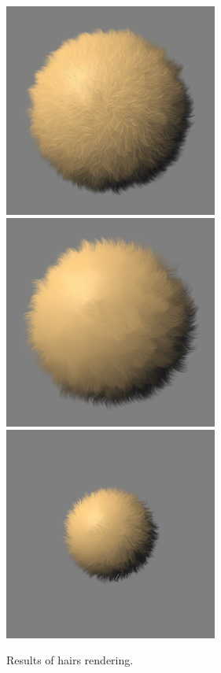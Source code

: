 \begin{figure}
    \begin{center}
    \includegraphics[width=70mm, height=70mm]{Resultats/bouledepoil1/final.png}
    \includegraphics[width=70mm, height=70mm]{Resultats/bouledepoil2/final.png}
    \includegraphics[width=70mm, height=70mm]{Resultats/bouledepoilFractalized/final.png}
    \end{center}
    \caption{Results of hairs rendering.}
    \label{results_hairs}
\end{figure}


